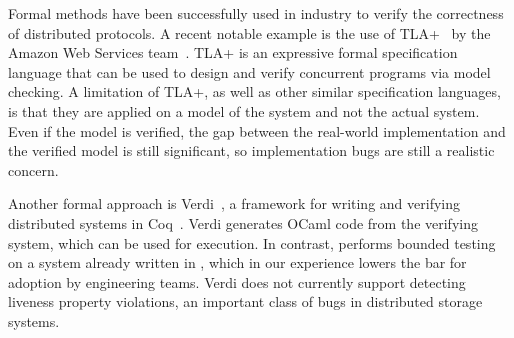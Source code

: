 
Formal methods have been successfully used in industry to verify the correctness of distributed protocols. A recent notable example is the use of TLA+~\cite{lamport1994temporal} by the Amazon Web Services team~\cite{newcombe2015aws}. TLA+ is an expressive formal specification language that can be used to design and verify concurrent programs via model checking. A limitation of TLA+, as well as other similar specification languages, is that they are applied on a model of the system and not the actual system. Even if the model is verified, the gap between the real-world implementation and the verified model is still significant, so implementation bugs are still a realistic concern.

Another formal approach is Verdi~\cite{wilcox2015verdi}, a framework for writing and verifying distributed systems in Coq~\cite{barras1997coq}. Verdi generates OCaml code from the verifying system, which can be used for execution. In contrast, \psharp performs bounded testing on a system already written in \csharp, which in our experience lowers the bar for adoption by engineering teams. Verdi does not currently support detecting liveness property violations, an important class of bugs in distributed storage systems.
